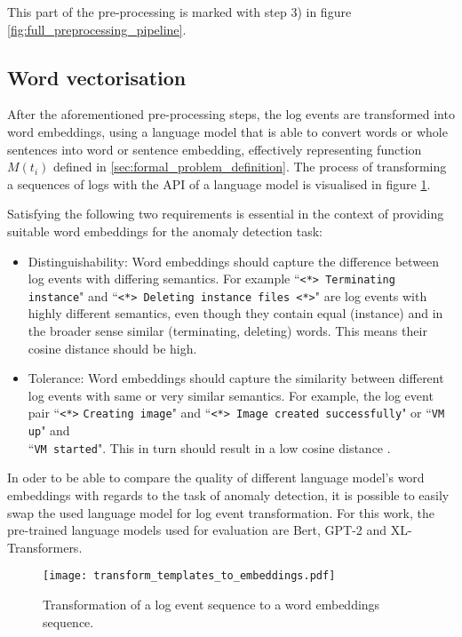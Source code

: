 This part of the pre-processing is marked with step 3) in figure \ref{fig:full_preprocessing_pipeline}.

\subsection{Word vectorisation \label{sec:word_vectorization}}
After the aforementioned pre-processing steps, the log events are transformed into word embeddings, using a language model that is able to convert words or whole sentences into word or sentence embedding, effectively representing function $M(t_i)$ defined in \ref{sec:formal_problem_definition}. The process of transforming a sequences of logs with the API of a language model is visualised in figure \ref{fig:transform_sequence_to_embeddings}.

Satisfying the following two requirements is essential in the context of providing suitable word embeddings for the anomaly detection task:
\begin{itemize}
	\item Distinguishability: Word embeddings should capture the difference between log events with differing semantics. For example ``\verb!<*> Terminating instance!" and ``\verb!<*> Deleting instance files <*>!" are log events with highly different semantics, even though they contain equal (instance) and in the broader sense similar (terminating, deleting) words. This means their cosine distance should be high.
	\item Tolerance: Word embeddings should capture the similarity between different log events with same or very similar semantics. For example, the log event pair ``\verb!<*>! \verb!Creating image!" and ``\verb!<*> Image created successfully!" or ``\verb!VM up!" and \\ ``\verb!VM started!". This in turn should result in a low cosine distance \cite{zhang2019robust}.
\end{itemize}

In oder to be able to compare the quality of different language model's word embeddings with regards to the task of anomaly detection, it is possible to easily swap the used language model for log event transformation. For this work, the pre-trained language models used for evaluation are Bert, GPT-2 and XL-Transformers. 


\begin{figure}[H]
	\centering
	\texttt{[image: transform\_templates\_to\_embeddings.pdf]}
	\caption{Transformation of a log event sequence to a word embeddings sequence.}
	\label{fig:transform_sequence_to_embeddings}
\end{figure}



